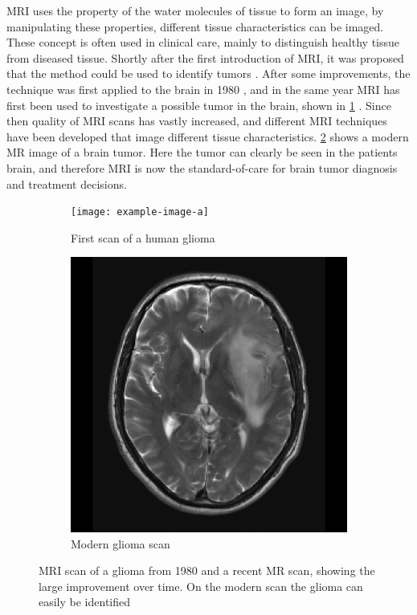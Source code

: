 \gls{MRI} uses the property of the water molecules of tissue to form an image, by manipulating these properties, different tissue characteristics can be imaged.
These concept is often used in clinical care, mainly to distinguish healthy tissue from diseased tissue.
Shortly after the first introduction of \gls{MRI}, it was proposed that the method could be used to identify tumors \autocite{damadian1971tumor}.
After some improvements, the technique was first applied to the brain in 1980 \autocite{holland1980brain}, and in the same year MRI has first been used to investigate a possible tumor in the brain, shown in \cref{fig:intro_MR_first} \autocite{hawkes1980NMRbrain}.
Since then quality of \gls{MRI} scans has vastly increased, and different \gls{MRI} techniques have been developed that image different tissue characteristics.
\cref{fig:intro_MR_modern} shows a modern \gls{MR} image of a brain tumor.
Here the tumor can clearly be seen in the patients brain, and therefore \gls{MRI} is now the standard-of-care for brain tumor diagnosis and treatment decisions.

\begin{figure}[hbt]
    \centering
    \begin{subfigure}[b]{0.45\textwidth}
        \centering
        \texttt{[image: example-image-a]}
        \caption{First scan of a human glioma}\label{fig:intro_MR_first}
    \end{subfigure}
    \begin{subfigure}[b]{0.45\textwidth}
        \centering
        \includegraphics[width=\textwidth]{Figures/T2_LGG.png}
        \caption{Modern glioma scan}\label{fig:intro_MR_modern}
    \end{subfigure}
    \caption{\acrshort{MRI} scan of a glioma from 1980 and a recent \acrshort{MR} scan, showing the large improvement over time. On the modern scan the glioma can easily be identified}\label{fig:intro_MR_comparison}
\end{figure}

